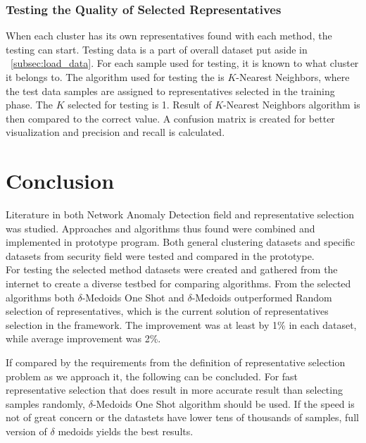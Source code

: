 \documentclass[thesis=B,english]{FITthesis}[2012/10/20]
\begin{document}
\subsection{Testing the Quality of Selected Representatives}
When each cluster has its own representatives found with each method, the testing can start.
Testing data is a part of overall dataset put aside in ~\ref{subsec:load_data}.
For each sample used for testing, it is known to what cluster it belongs to.
The algorithm used for testing the is $K$-Nearest Neighbors, where the test data samples are assigned to representatives selected in the training phase.
The $K$ selected for testing is 1. 
Result of $K$-Nearest Neighbors algorithm is then compared to the correct value.
A confusion matrix is created for better visualization and precision and recall is calculated.



\chapter{Conclusion}
Literature in both Network Anomaly Detection field and representative selection was studied.
Approaches and algorithms thus found were combined and implemented in prototype program.
Both general clustering datasets and specific datasets from security field were tested and compared in the prototype. \\

For testing the selected method datasets were created and gathered from the internet to create a diverse testbed for comparing algorithms.
From the selected algorithms both $\delta$-Medoids One Shot and $\delta$-Medoids outperformed Random selection of representatives, which is the current solution of representatives selection in the framework.
The improvement was at least by 1\% in each dataset, while average improvement was 2\%.  \\


If compared by the requirements from the definition of representative selection problem as we approach it, the following can be concluded.
For fast representative selection that does result in more accurate result than selecting samples randomly, $\delta$-Medoids One Shot algorithm should be used.
If the speed is not of great concern or the datastets have lower tens of thousands of samples, full version of $\delta$ medoids yields the best results.
\end{document}
